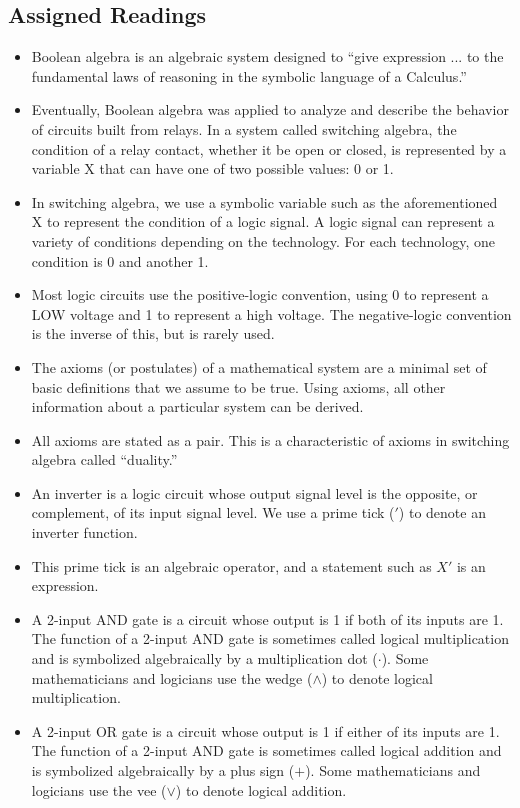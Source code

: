 \documentclass[10pt,a4paper]{article}
\begin{document}
\subsection{Assigned Readings}
\begin{itemize}
\item Boolean algebra is an algebraic system designed to ``give expression ... to the fundamental laws of reasoning in the symbolic language of a Calculus.''
\item Eventually, Boolean algebra was applied to analyze and describe the behavior of circuits built from relays. In a system called switching algebra, the condition of a relay contact, whether it be open or closed, is represented by a variable X that can have one of two possible values: 0 or 1. 
\item In switching algebra, we use a symbolic variable such as the aforementioned X to represent the condition of a logic signal. A logic signal can represent a variety of conditions depending on the technology. For each technology, one condition is 0 and another 1. 
\item Most logic circuits use the positive-logic convention, using 0 to represent a LOW voltage and 1 to represent a high voltage. The negative-logic convention is the inverse of this, but is rarely used.
\item The axioms (or postulates) of a mathematical system are a minimal set of basic definitions that we assume to be true. Using axioms, all other information about a particular system can be derived.
\item All axioms are stated as a pair. This is a characteristic of axioms in switching algebra called ``duality.''
\item An inverter is a logic circuit whose output signal level is the opposite, or complement, of its input signal level. We use a prime tick ($'$) to denote an inverter function. 
\item This prime tick is an algebraic operator, and a statement such as $X'$ is an expression. 
\item A 2-input AND gate is a circuit whose output is 1 if both of its inputs are 1. The function of a 2-input AND gate is sometimes called logical multiplication and is symbolized algebraically by a multiplication dot ($\cdot$). Some mathematicians and logicians use the wedge ($\wedge$) to denote logical multiplication. 
\item A 2-input OR gate is a circuit whose output is 1 if either of its inputs are 1. The function of a 2-input AND gate is sometimes called logical addition and is symbolized algebraically by a plus sign ($+$). Some mathematicians and logicians use the vee ($\vee$) to denote logical addition. 

\end{itemize}
\end{document}
